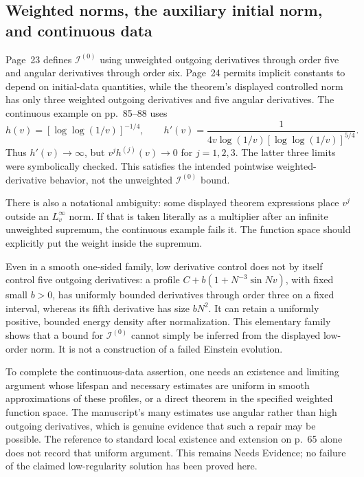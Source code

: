 \documentclass[10pt]{article}
\begin{document}
\subsection*{Weighted norms, the auxiliary initial norm, and continuous data}
Page 23 defines \(\mathcal I^{(0)}\) using unweighted outgoing derivatives through order five and angular derivatives through order six. Page 24 permits implicit constants to depend on initial-data quantities, while the theorem’s displayed controlled norm has only three weighted outgoing derivatives and five angular derivatives. The continuous example on pp. 85–88 uses \[h(v)=[\log\log(1/v)]^{-1/4},\qquad
 h'(v)=\frac{1}{4v\log(1/v)[\log\log(1/v)]^{5/4}}.\] Thus \(h'(v)\to\infty\), but \(v^j h^{(j)}(v)\to0\) for \(j=1,2,3\). The latter three limits were symbolically checked. This satisfies the intended pointwise weighted-derivative behavior, not the unweighted \(\mathcal I^{(0)}\) bound.\par
There is also a notational ambiguity: some displayed theorem expressions place \(v^j\) outside an \(L^\infty_v\) norm. If that is taken literally as a multiplier after an infinite unweighted supremum, the continuous example fails it. The function space should explicitly put the weight inside the supremum.\par
Even in a smooth one-sided family, low derivative control does not by itself control five outgoing derivatives: a profile \(C+b(1+N^{-3}\sin Nv)\), with fixed small \(b>0\), has uniformly bounded derivatives through order three on a fixed interval, whereas its fifth derivative has size \(bN^2\). It can retain a uniformly positive, bounded energy density after normalization. This elementary family shows that a bound for \(\mathcal I^{(0)}\) cannot simply be inferred from the displayed low-order norm. It is not a construction of a failed Einstein evolution.\par
To complete the continuous-data assertion, one needs an existence and limiting argument whose lifespan and necessary estimates are uniform in smooth approximations of these profiles, or a direct theorem in the specified weighted function space. The manuscript’s many estimates use angular rather than high outgoing derivatives, which is genuine evidence that such a repair may be possible. The reference to standard local existence and extension on p. 65 alone does not record that uniform argument. This remains Needs Evidence; no failure of the claimed low-regularity solution has been proved here.\par
\end{document}
